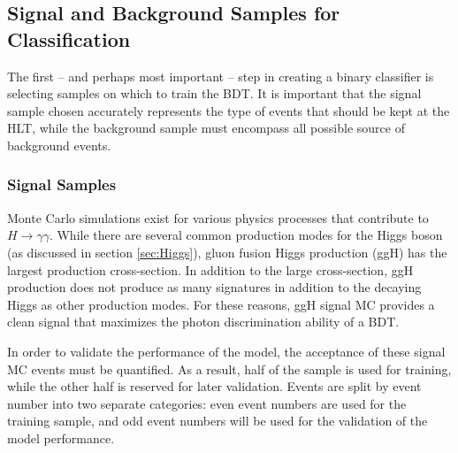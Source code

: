 \documentclass[12pt]{ucsddissertation}
\begin{document}
\subsection{Signal and Background Samples for Classification}
The first -- and perhaps most important -- step in creating a binary classifier is selecting samples on which to train the BDT. It is important that the signal sample chosen accurately represents the type of events that should be kept at the HLT, while the background sample must encompass all possible source of background events. 
\subsubsection{Signal Samples}\label{sec:HLTMCSamples}
Monte Carlo simulations exist for various physics processes that contribute to $H \rightarrow \gamma\gamma$. While there are several common production modes for the Higgs boson (as discussed in section \ref{sec:Higgs}), gluon fusion Higgs production (ggH) has the largest production cross-section. In addition to the large cross-section, ggH production does not produce as many signatures in addition to the decaying Higgs as other production modes. For these reasons, ggH signal MC provides a clean signal that maximizes the photon discrimination ability of a BDT. 

In order to validate the performance of the model, the acceptance of these signal MC events must be quantified. As a result, half of the sample is used for training, while the other half is reserved for later validation. Events are split by event number into two separate categories: even event numbers are used for the training sample, and odd event numbers will be used for the validation of the model performance. 
\end{document}
